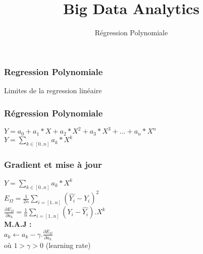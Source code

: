 \documentclass{formation}
\title{Big Data Analytics}
\subtitle{Régression Polynomiale}
\begin{document}
\maketitle


\begin{frame}
  \frametitle{Regression Polynomiale}
  Limites de la regression linéaire
\end{frame}

\begin{frame}
  \frametitle{Régression Polynomiale}
  $Y=a_0+a_1*X+a_2*X^2+a_3*X^3+...+a_n*X^n$ \\
  \newline
  $Y=\underset{k \in [0..n]}{\sum}{a_k*X^k}$
\end{frame}

\begin{frame}
  \frametitle{Gradient et mise à jour}
  $Y=\underset{k \in [0..n]}{\sum}{a_k*X^k}$ \\
  $\;$ \\
  $E_{\Omega} = \frac{1}{2n}\underset{i=[1..n]}{\sum}( \hat{Y_i} - Y_i )^2$ \\
  $\;$ \\
  $\frac{\partial{E_{\Omega}}}{\partial{a_k}} = \frac{1}{n}\underset{i=[1..n]}{\sum}(Y_i - \hat{Y_i}).X^k$ \\
  $\;$ \\
  $\;$ \\
  \textbf{M.A.J :} \\
  $\;$ \\
  $a_k \leftarrow a_k - \gamma.\frac{\partial{E_{\Omega}}}{\partial{a_k}}$ \\
  $\;$ \\
  où $1 > \gamma > 0$ (learning rate)
\end{frame}
\end{document}
